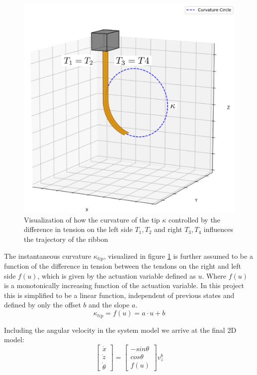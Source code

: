 \begin{figure} [H]
    \centering
    \includegraphics[width=0.6\linewidth]{images/pythonpictures/curvature.PNG}
    \caption{Visualization of how the curvature of the tip $\kappa$ controlled by the difference in tension on the left side \(T_1, T_2\) and right \(T_3, T_4\) influences the trajectory of the ribbon}
    \label{fig:curvature}
\end{figure}

The instantaneous curvature $\kappa_{tip}$, visualized in figure \ref{fig:curvature} is further assumed to be a function of the difference in tension between the tendons on the right and left side $f(u)$, which is given by the actuation variable defined as $u$. Where $f(u)$ is a monotonically increasing function of the actuation variable. In this project this is simplified to be a linear function, independent of previous states and defined by only the offset $b$ and the slope $a$. 
\begin{equation}
	\kappa_{tip} = f(u) = a\cdot u + b
\end{equation}

Including the angular velocity in the system model we arrive at the final 2D model:
\begin{equation}
	\begin{bmatrix}
		\dot{x} \\ \dot{z} \\ \dot{\theta}
	\end{bmatrix} = \begin{bmatrix}
	-sin\theta \\ cos\theta \\ f(u)
	\end{bmatrix}v_z^b
\end{equation}



